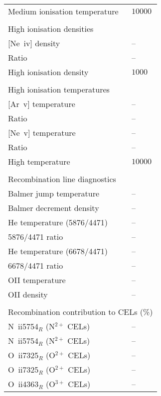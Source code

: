 \begin{longtable}[l]{ll}
 Medium ionisation temperature       & $10000$\\
 \vspace{0.2cm}\\\multicolumn{2}{l}{High ionisation densities}\\ \hline
 {}[Ne~{\sc iv}] density             & -- \\
 Ratio                               & -- \\
 High ionisation density             & $ 1000$\\
 \vspace{0.2cm}\\\multicolumn{2}{l}{High ionisation temperatures}\\ \hline
 {}[Ar~{\sc v}] temperature          & -- \\
 Ratio                               & -- \\
 {}[Ne~{\sc v}] temperature          & -- \\
 Ratio                               & -- \\
 High temperature                    & $10000$\\
 \vspace{0.2cm}\\\multicolumn{2}{l}{Recombination line diagnostics}\\ \hline
 Balmer jump temperature             & -- \\
 Balmer decrement density            & -- \\
 He temperature (5876/4471)          & -- \\
 5876/4471 ratio                     & -- \\
 He temperature (6678/4471)          & -- \\
 6678/4471 ratio                     & -- \\
 OII temperature                     & -- \\
 OII density                         & -- \\
 \vspace{0.2cm}\\\multicolumn{2}{l}{Recombination contribution to CELs (\%)}\\ \hline
 N~{\sc ii}5754$_R$ (N$^{2+}$ CELs)  & -- \\
 N~{\sc ii}5754$_R$ (N$^{2+}$ CELs)  & -- \\
 O~{\sc ii}7325$_R$ (O$^{2+}$ CELs)  & -- \\
 O~{\sc ii}7325$_R$ (O$^{2+}$ CELs)  & -- \\
 O~{\sc ii}4363$_R$ (O$^{3+}$ CELs)  & -- \\

\end{longtable}
